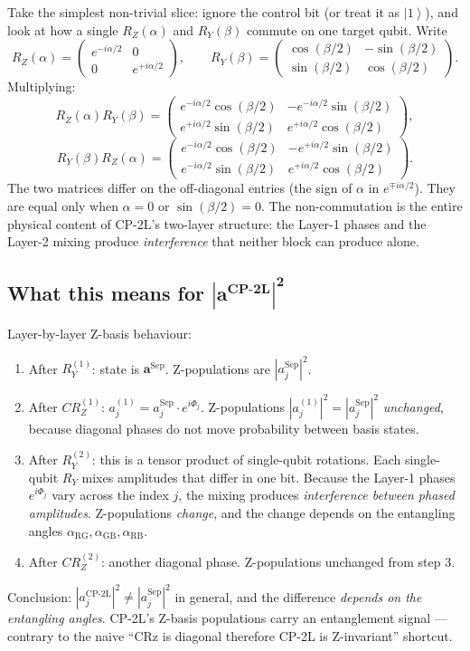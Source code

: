 \documentclass[11pt]{article}
\newcommand{\ket}[1]{\left| #1 \right\rangle}
\begin{document}
Take the simplest non-trivial slice: ignore the control bit (or treat it as $\ket{1}$), and look at how a single $R_Z(\alpha)$ and $R_Y(\beta)$ commute on one target qubit. Write
\[
R_Z(\alpha) = \begin{pmatrix} e^{-i\alpha/2} & 0 \\ 0 & e^{+i\alpha/2} \end{pmatrix}, \qquad
R_Y(\beta) = \begin{pmatrix} \cos(\beta/2) & -\sin(\beta/2) \\ \sin(\beta/2) & \cos(\beta/2) \end{pmatrix}.
\]
Multiplying:
\[
R_Z(\alpha) R_Y(\beta) = \begin{pmatrix} e^{-i\alpha/2}\cos(\beta/2) & -e^{-i\alpha/2}\sin(\beta/2) \\ e^{+i\alpha/2}\sin(\beta/2) & e^{+i\alpha/2}\cos(\beta/2) \end{pmatrix},
\]
\[
R_Y(\beta) R_Z(\alpha) = \begin{pmatrix} e^{-i\alpha/2}\cos(\beta/2) & -e^{+i\alpha/2}\sin(\beta/2) \\ e^{-i\alpha/2}\sin(\beta/2) & e^{+i\alpha/2}\cos(\beta/2) \end{pmatrix}.
\]
The two matrices differ on the off-diagonal entries (the sign of $\alpha$ in $e^{\mp i\alpha/2}$). They are equal only when $\alpha = 0$ or $\sin(\beta/2) = 0$. The non-commutation is the entire physical content of CP-2L's two-layer structure: the Layer-1 phases and the Layer-2 mixing produce \emph{interference} that neither block can produce alone.

\subsection{What this means for $\boldsymbol{|a^\text{CP-2L}|^2}$}

Layer-by-layer Z-basis behaviour:
\begin{enumerate}
\item After $R_Y^{(1)}$: state is $\mathbf a^\text{Sep}$. Z-populations are $|a^\text{Sep}_j|^2$.
\item After $CR_Z^{(1)}$: $a^{(1)}_j = a^\text{Sep}_j \cdot e^{i\Phi_j}$. Z-populations $|a^{(1)}_j|^2 = |a^\text{Sep}_j|^2$ \emph{unchanged}, because diagonal phases do not move probability between basis states. \checkmark
\item After $R_Y^{(2)}$: this is a tensor product of single-qubit rotations. Each single-qubit $R_Y$ mixes amplitudes that differ in one bit. Because the Layer-1 phases $e^{i\Phi_j}$ vary across the index $j$, the mixing produces \emph{interference between phased amplitudes}. Z-populations \emph{change}, and the change depends on the entangling angles $\alpha_\text{RG}, \alpha_\text{GB}, \alpha_\text{RB}$.
\item After $CR_Z^{(2)}$: another diagonal phase. Z-populations unchanged from step 3.
\end{enumerate}
Conclusion: $|a^\text{CP-2L}_j|^2 \neq |a^\text{Sep}_j|^2$ in general, and the difference \emph{depends on the entangling angles}. CP-2L's Z-basis populations carry an entanglement signal --- contrary to the naive ``CRz is diagonal therefore CP-2L is Z-invariant'' shortcut.
\end{document}
